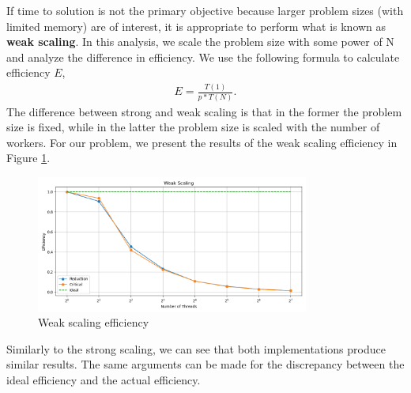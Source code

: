 \documentclass[unicode,11pt,a4paper,oneside,numbers=endperiod,openany]{scrartcl}
\begin{document}
\begin{enumerate}
    If time to solution is not the primary objective because larger problem
    sizes (with limited memory) are of interest, it is appropriate to perform
    what is known as \textbf{weak scaling}. In this analysis, we scale the
    problem size with some power of N and analyze the difference in efficiency.
    We use the following formula to calculate efficiency $E$,
    \begin{align}
      E =  \frac{T(1)}{p*T(N)}.
    \end{align}
    The difference between strong and weak scaling is that in the former the
    problem size is fixed, while in the latter the problem size is scaled with
    the number of workers.
    For our problem, we present the results of the weak scaling efficiency in
    Figure \ref{fig:weak-scaling}.
    \begin{figure}[h]
      \centering
      \includegraphics[width=0.8\textwidth]{../pi/weak_scaling_plot.png}
      \caption{Weak scaling efficiency}
      \label{fig:weak-scaling}
    \end{figure}
    Similarly to the strong scaling, we can see that both implementations
    produce similar results. The same arguments can be made for the discrepancy
    between the ideal efficiency and the actual efficiency.

\end{enumerate}
\end{document}
